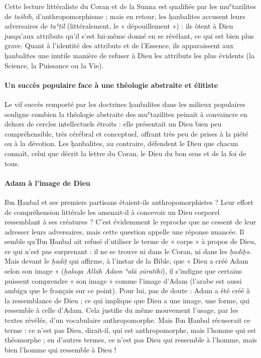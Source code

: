 Cette lecture littéraliste du Coran et de la Sunna est qualifiée par les
muʿtazilites de \emph{tašbīh},  d'anthropomorphisme ; mais en retour, les
ḥanbalites accusent leurs adversaires de \emph{taʿṭīl} (littéralement,
le « dépouillement ») : ils ôtent à Dieu jusqu'aux attributs qu'il s'est
lui-même donné en se révélant, ce qui est bien plus grave. Quant à
l'identité des attributs et de l'Essence, ils apparaissent aux
ḥanbalites une inutile manière de refuser à Dieu les attributs les plus
évidents (la Science, la Puissance ou la Vie). 
\paragraph{Un succès populaire face à une théologie abstraite et élitiste} Le vif succès remporté
par les doctrines ḥanbalites dans les milieux populaires souligne
combien la théologie abstraite des muʿtazilites peinait à convaincre en
dehors de cercles intellectuels étroits : elle présentait un Dieu bien
peu compréhensible, très cérébral et conceptuel, offrant très peu de
prises à la piété ou à la dévotion. Les ḥanbalites, au contraire,
défendent le Dieu que chacun connaît, celui que décrit la lettre du
Coran, le Dieu du bon sens et de la foi de tous.

\paragraph{Adam à l'image de Dieu}Ibn Ḥanbal et ses premiers partisans étaient-ils anthropomorphistes ?
Leur effort de
compréhension littérale les amenait-il à concevoir un Dieu corporel
ressemblant à ses créatures ? C'est évidemment le reproche que ne
cessent de leur adresser leurs adversaires, mais cette question appelle
une réponse nuancée. Il semble qu'Ibn Ḥanbal ait refusé d'utiliser
le terme de « corps » à propos de Dieu, ce qui n'est pas surprenant : il
ne se trouve ni dans le Coran, ni dans les \emph{ḥadīṯ}-s. Mais devant
le \emph{ḥadīṯ} qui affirme, à l'instar de la Bible, que « Dieu a créé
Adam selon son image » (\emph{ḫalaqa Allāh Adam ʿalā ṣūratihi}), il
s'indigne que certains puissent comprendre « son image » comme l'image
d'Adam (l'arabe est aussi ambigu que le français sur ce point). Pour
lui, pas de doute : Adam a été créé à la ressemblance de Dieu ; ce qui
implique que Dieu a une image, une forme, qui ressemble à celle d'Adam.
Cela justifie du même mouvement l'usage, par les textes révélés, d'un
vocabulaire anthropomorphe. Mais Ibn Ḥanbal récuserait ce terme : ce
n'est pas Dieu, dirait-il, qui est anthropomorphe, mais l'homme qui est
théomorphe ; en d'autres termes, ce n'est pas Dieu qui ressemble à
l'homme, mais bien l'homme qui ressemble à Dieu !



